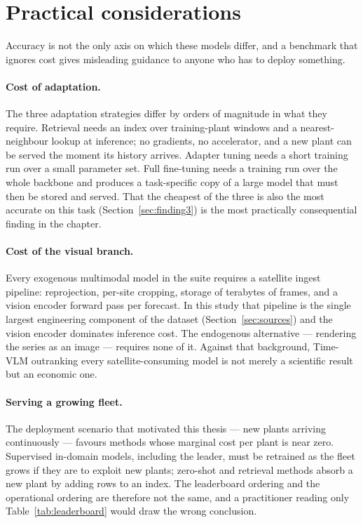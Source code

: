 \section{Practical considerations}
\label{sec:practical}

Accuracy is not the only axis on which these models differ, and a benchmark that ignores cost
gives misleading guidance to anyone who has to deploy something.

\paragraph{Cost of adaptation.} The three adaptation strategies differ by orders of magnitude
in what they require. Retrieval needs an index over training-plant windows and a
nearest-neighbour lookup at inference; no gradients, no accelerator, and a new plant can be
served the moment its history arrives. Adapter tuning needs a short training run over a small
parameter set. Full fine-tuning needs a training run over the whole backbone and produces a
task-specific copy of a large model that must then be stored and served. That the cheapest of
the three is also the most accurate on this task (Section~\ref{sec:finding3}) is the most
practically consequential finding in the chapter.

\paragraph{Cost of the visual branch.} Every exogenous multimodal model in the suite requires
a satellite ingest pipeline: reprojection, per-site cropping, storage of terabytes of frames,
and a vision encoder forward pass per forecast. In this study that pipeline is the single
largest engineering component of the dataset (Section~\ref{sec:sources}) and the vision
encoder dominates inference cost. The endogenous alternative --- rendering the series as an
image --- requires none of it. Against that background, Time-VLM outranking every
satellite-consuming model is not merely a scientific result but an economic one.

\paragraph{Serving a growing fleet.} The deployment scenario that motivated this thesis ---
new plants arriving continuously --- favours methods whose marginal cost per plant is near
zero. Supervised in-domain models, including the leader, must be retrained as the fleet
grows if they are to exploit new plants; zero-shot and retrieval methods absorb a new plant
by adding rows to an index. The leaderboard ordering and the operational ordering are
therefore not the same, and a practitioner reading only Table~\ref{tab:leaderboard} would
draw the wrong conclusion.

